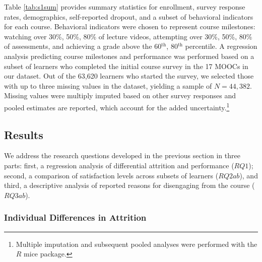 \documentclass{sigchi}\usepackage[]{graphicx}\usepackage[]{color}
\begin{document}
Table \ref{tab:s1sum} provides summary statistics for enrollment, survey response rates, demographics, self-reported dropout, and a subset of behavioral indicators for each course. Behavioral indicators were chosen to represent course milestones: watching over 30\%, 50\%, 80\% of lecture videos, attempting over 30\%, 50\%, 80\% of assessments, and achieving a grade above the 60$^\text{th}$, 80$^\text{th}$ percentile. A regression analysis predicting course milestones and performance was performed based on a subset of learners who completed the initial course survey in the 17 MOOCs in our dataset. Out of the 63,620 learners who started the survey, we selected those with up to three missing values in the dataset, yielding a sample of $N=44,382$. Missing values were multiply imputed based on other survey responses and pooled estimates are reported, which account for the added uncertainty.\footnote{Multiple imputation and subsequent pooled analyses were performed with the $R$ mice package.}
 
\subsection{Results}

We address the research questions developed in the previous section in three parts: first, a regression analysis of differential attrition and performance ($RQ1$); second, a comparison of satisfaction levels across subsets of learners ($RQ2ab$), and third, a descriptive analysis of reported reasons for disengaging from the course ($RQ3ab$).

\subsubsection{Individual Differences in Attrition}
\end{document}
